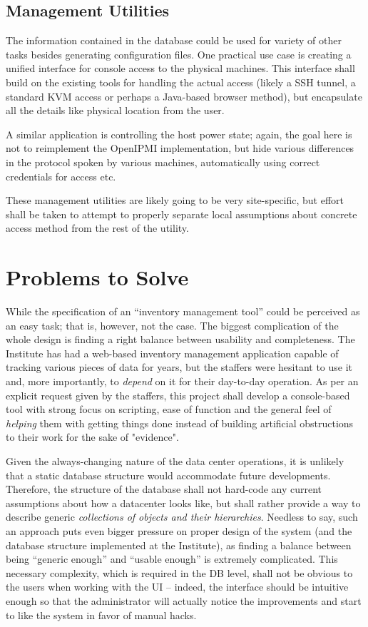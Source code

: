\documentclass{article}
\begin{document}
\subsection{Management Utilities}

The information contained in the database could be used for variety of other tasks besides generating configuration files.  One
practical use case is creating a unified interface for console access to the physical machines.  This interface shall build on the
existing tools for handling the actual access (likely a SSH tunnel, a standard KVM access or perhaps a Java-based browser method),
but encapsulate all the details like physical location from the user.

A similar application is controlling the host power state; again, the goal here is not to reimplement the OpenIPMI implementation,
but hide various differences in the protocol spoken by various machines, automatically using correct credentials for access etc.

These management utilities are likely going to be very site-specific, but effort shall be taken to attempt to properly separate
local assumptions about concrete access method from the rest of the utility.

\section{Problems to Solve}

While the specification of an ``inventory management tool'' could be perceived as an easy task; that is, however, not the case.
The biggest complication of the whole design is finding a right balance between usability and completeness.  The Institute has had
a web-based inventory management application capable of tracking various pieces of data for years, but the staffers were hesitant
to use it and, more importantly, to {\em depend} on it for their day-to-day operation.  As per an explicit request given by the
staffers, this project shall develop a console-based tool with strong focus on scripting, ease of function and the general feel of
{\em helping} them with getting things done instead of building artificial obstructions to their work for the sake of "evidence".

Given the always-changing nature of the data center operations, it is unlikely that a static database structure would accommodate
future developments.  Therefore, the structure of the database shall not hard-code any current assumptions about how a datacenter
looks like, but shall rather provide a way to describe generic {\em collections of objects and their hierarchies}.  Needless to
say, such an approach puts even bigger pressure on proper design of the system (and the database structure implemented at the
Institute), as finding a balance between being ``generic enough'' and ``usable enough'' is extremely complicated.  This necessary
complexity, which is required in the DB level, shall not be obvious to the users when working with the UI -- indeed, the interface
should be intuitive enough so that the administrator will actually notice the improvements and start to like the system in favor
of manual hacks.
\end{document}
